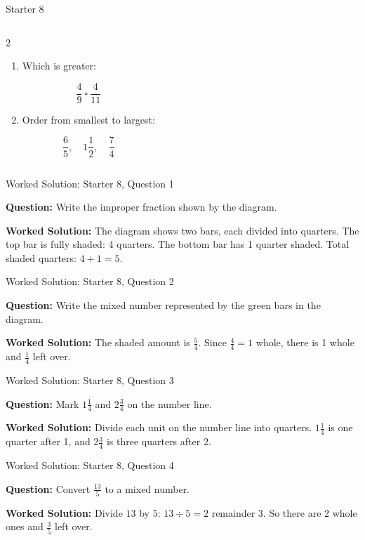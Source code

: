 \documentclass{beamer}
\newcommand{\ashow}[1]{\uncover<2->{\textcolor{red}{\small #1}}}
\begin{document}
\begin{frame}{Starter 8}
\begin{columns}
\begin{multicols}{2}
\begin{enumerate}
\[
\frac{16}{40}
\]
\ashow{$\frac{2}{5}$}

\item Which is greater:

\[
\frac{4}{9}\ \square\ \frac{4}{11}
\]
\ashow{$\frac{4}{9}$}

\item Order from smallest to largest:

\[
\frac{6}{5},\quad 1\frac{1}{2},\quad \frac{7}{4}
\]
\ashow{$\frac{6}{5},\ 1\frac{1}{2},\ \frac{7}{4}$}

\end{enumerate}

\end{multicols}

\end{columns}

\end{frame}

\begin{frame}{Worked Solution: Starter 8, Question 1}
\hypertarget{work-st8}{}

\textbf{Question:} Write the improper fraction shown by the diagram.

\textbf{Worked Solution:} The diagram shows two bars, each divided into quarters. The top bar is fully shaded: 4 quarters. The bottom bar has 1 quarter shaded. Total shaded quarters: $4+1=5$. \ashow{$\frac{5}{4}$.}
\end{frame}

\begin{frame}{Worked Solution: Starter 8, Question 2}

\textbf{Question:} Write the mixed number represented by the green bars in the diagram.

\textbf{Worked Solution:} The shaded amount is $\frac54$. Since $\frac44 = 1$ whole, there is 1 whole and $\frac14$ left over. \ashow{$1\frac14$.}
\end{frame}

\begin{frame}{Worked Solution: Starter 8, Question 3}

\textbf{Question:} Mark $1\frac{1}{4}$ and $2\frac{3}{4}$ on the number line.

\textbf{Worked Solution:} Divide each unit on the number line into quarters. $1\frac14$ is one quarter after 1, and $2\frac34$ is three quarters after 2. \ashow{Mark at $1\frac14$ and $2\frac34$.}
\end{frame}

\begin{frame}{Worked Solution: Starter 8, Question 4}

\textbf{Question:} Convert $\frac{13}{5}$ to a mixed number.

\textbf{Worked Solution:} Divide $13$ by $5$: $13 \div 5 = 2$ remainder $3$. So there are 2 whole ones and $\frac35$ left over. \ashow{$2\frac35$.}
\end{frame}
\end{document}
